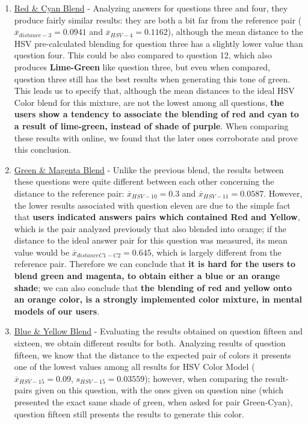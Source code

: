 \begin{enumerate}
  \item \ul{Red \& Cyan Blend} - Analyzing answers for questions three and four, they produce fairly similar results: they are both a bit far from the reference pair ($\overline{x}_{distance-3} = 0.0941$ and
  $\overline{x}_{HSV-4} = 0.1162$), although the mean distance to the HSV pre-calculated blending for question three has a slightly lower value than question four. This could be also compared to question 12, which also
  produces \textbf{Lime-Green} like question three, but even when compared, question three still has the best results when generating this tone of green. This leads us to specify that, although the mean distances to the
  ideal HSV Color blend for this mixture, are not the lowest among all questions, \textbf{the users show a tendency to associate the blending of red and cyan to a result of lime-green, instead of shade of purple}. When comparing
  these results with online, we found that the later ones corroborate and prove this conclusion.
  \item \ul{Green \& Magenta Blend} - Unlike the previous blend, the results between these questions were quite different between each other concerning the distance to the reference pair: $\overline{x}_{HSV-10} = 0.3$
  and $\overline{x}_{HSV-11} = 0.0587$. However, the lower results associated with question eleven are due to the simple fact that \textbf{users indicated answers pairs which contained Red and Yellow}, which is the pair
  analyzed previously that also blended into orange; if the distance to the ideal answer pair for this question was measured, its mean value would be $\overline{x}_{distanceC1-C2} = 0.645$, which is largely different from the
  reference pair. Therefore we can conclude that \textbf{it is hard for the users to blend green and magenta, to obtain either a blue or an orange shade}; we can also conclude that \textbf{the blending of red and yellow
  onto an orange color, is a strongly implemented color mixture, in mental models of our users}.
  \item \ul{Blue \& Yellow Blend} - Evaluating the results obtained on question fifteen and sixteen, we obtain different results for both. Analyzing results of question fifteen, we know that the distance to the expected
  pair of colors it presents one of the lowest values among all results for HSV Color Model ($\overline{x}_{HSV-15} = 0.09$, $s_{HSV-15} = 0.03559$); however, when comparing the result-pairs given on this question, with
  the ones given on question nine (which presented the exact same shade of green, when asked for pair Green-Cyan), question fifteen still presents the results to generate this color.

\end{enumerate}
